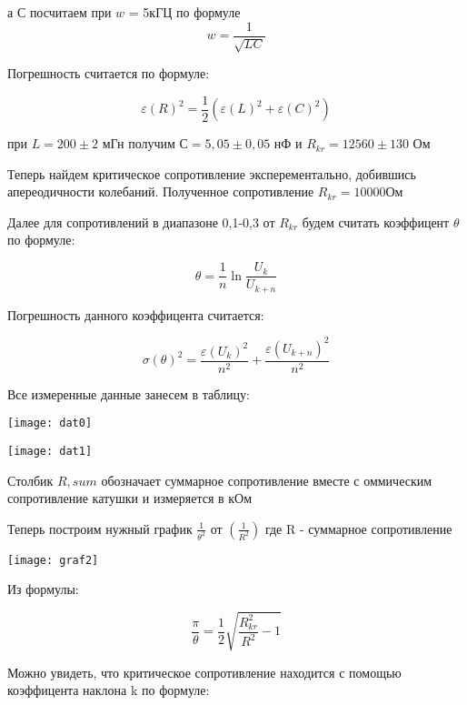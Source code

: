 \documentclass[a4paper,12pt]{article}
\begin{document}
	 а С посчитаем при $w$ = 5кГЦ по формуле
	 \begin{equation}
	 w =\frac{1}{\sqrt{LC}}
	 \end{equation}
	 
	 	Погрешность считается по формуле:
	 	
	 	\begin{equation}
	 	\varepsilon(R)^2 = \frac{1}2(\varepsilon(L)^2+\varepsilon(C)^2)
	 	\end{equation}
	 	
	  при $L = 200\pm 2$ мГн получим $С = 5,05\pm0,05$ нФ и $R_{kr} = 12560\pm 130$ Ом
	  
	  
	  Теперь найдем критическое сопротивление эксперементально, добившись апереодичности колебаний. Полученное сопротивление $R_{kr}=10000$Ом
	  
	  
	  Далее для сопротивлений в диапазоне 0,1-0,3 от $R_{kr}$ будем считать коэффицент $\theta$ по формуле:
	  
	  \begin{equation}
	  \theta=\frac{1}n \ln{\frac{U_k}{U_{k+n}}}
	  \end{equation}
	  
	  Погрешность данного коэффицента считается:
	  
	  \begin{equation}
	  \sigma(\theta)^2 = \frac{\varepsilon(U_k)^2}{n^2} + \frac{\varepsilon(U_{k+n})^2}{n^2}
	  \end{equation}
	  
	  Все измеренные данные занесем в таблицу:
	  
	  \texttt{[image: dat0]}
	  
	  \texttt{[image: dat1]}
	
	Столбик $R,sum$ обозначает суммарное сопротивление вместе с оммическим сопротивление катушки и измеряется в кОм
	
	
	Теперь построим нужный график $\frac{1}{\theta^2}$ от $(\frac{1}{R^2})$ где R - суммарное сопротивление
	
	\texttt{[image: graf2]}
	
	
	
	Из формулы:
	
	\begin{equation}
	\frac{\pi}\theta=\frac{1}2\sqrt{\frac{R_{kr}^2}{R^2}-1}
	\end{equation}
	
	Можно увидеть, что критическое сопротивление находится с помощью коэффицента наклона k по формуле:
\end{document}
